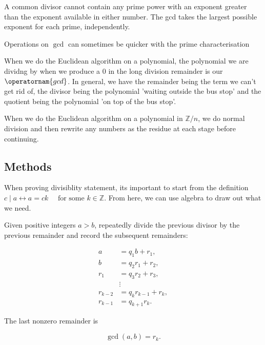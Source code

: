 \begin{mistake}
  A common divisor cannot contain any prime power with an exponent greater than the exponent available in either number. The gcd takes the largest possible exponent for each prime, independently.
\end{mistake}

\begin{mistake}
  Operations on \(\operatorname{gcd}\) can sometimes be quicker with the prime characterisation
\end{mistake}

\begin{mistake}
  When we do the Euclidean algorithm on a polynomial, the polynomial we are dividng by when we produce a 0 in the long division remainder is our \(\operatornam{gcd}\). In general, we have the remainder being the term we can't get rid of, the divisor being the polynomial 'waiting outside the bus stop' and the quotient being the polynomial 'on top of the bus stop'.
\end{mistake}

\begin{mistake}
  When we do the Euclidean algorithm on a polynomial in \(\mathbb{Z}/n\), we do normal division and then rewrite any numbers as the residue at each stage before continuing.
\end{mistake}

\subsection{Methods}

\begin{method}
  When proving divisiblity statement, its important to start from the definition \(c \mid a \longleftrightarrow a=c k \quad \text { for some } k \in \mathbb{Z}\). From here, we can use algebra to draw out what we need.
\end{method}

\begin{method}
  Given positive integers \(a>b\), repeatedly divide the previous divisor by the previous remainder and record the subsequent remainders:

\[
\begin{aligned}
a & =q_1 b+r_1, \\
b & =q_2 r_1+r_2, \\
r_1 & =q_3 r_2+r_3, \\
& \vdots \\
r_{k-2} & =q_k r_{k-1}+r_k, \\
r_{k-1} & =q_{k+1} r_k .
\end{aligned}
\]


The last nonzero remainder is

\[
\operatorname{gcd}(a, b)=r_k .
\]
\end{method}

